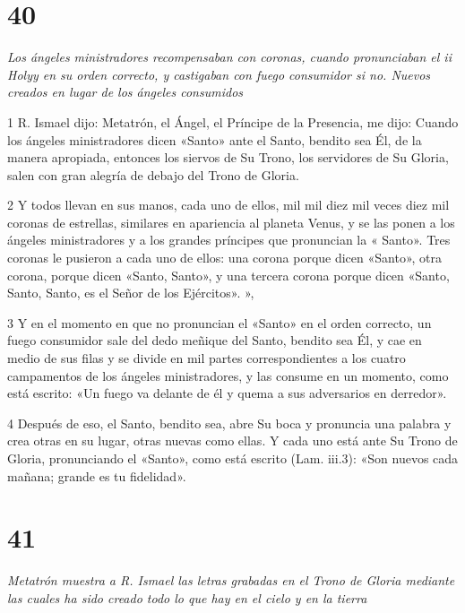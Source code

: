 \chapter{40}

\par \textit{Los ángeles ministradores recompensaban con coronas, cuando pronunciaban el ii Holyy en su orden correcto, y castigaban con fuego consumidor si no. Nuevos creados en lugar de los ángeles consumidos}

\par 1 R. Ismael dijo: Metatrón, el Ángel, el Príncipe de la Presencia, me dijo: Cuando los ángeles ministradores dicen «Santo» ante el Santo, bendito sea Él, de la manera apropiada, entonces los siervos de Su Trono, los servidores de Su Gloria, salen con gran alegría de debajo del Trono de Gloria.

\par 2 Y todos llevan en sus manos, cada uno de ellos, mil mil diez mil veces diez mil coronas de estrellas, similares en apariencia al planeta Venus, y se las ponen a los ángeles ministradores y a los grandes príncipes que pronuncian la « Santo». Tres coronas le pusieron a cada uno de ellos: una corona porque dicen «Santo», otra corona, porque dicen «Santo, Santo», y una tercera corona porque dicen «Santo, Santo, Santo, es el Señor de los Ejércitos». »,

\par 3 Y en el momento en que no pronuncian el «Santo» en el orden correcto, un fuego consumidor sale del dedo meñique del Santo, bendito sea Él, y cae en medio de sus filas y se divide en mil partes correspondientes a los cuatro campamentos de los ángeles ministradores, y las consume en un momento, como está escrito: «Un fuego va delante de él y quema a sus adversarios en derredor».

\par 4 Después de eso, el Santo, bendito sea, abre Su boca y pronuncia una palabra y crea otras en su lugar, otras nuevas como ellas. Y cada uno está ante Su Trono de Gloria, pronunciando el «Santo», como está escrito (Lam. iii.3): «Son nuevos cada mañana; grande es tu fidelidad».


\chapter{41}

\par \textit{Metatrón muestra a R. Ismael las letras grabadas en el Trono de Gloria mediante las cuales ha sido creado todo lo que hay en el cielo y en la tierra}

